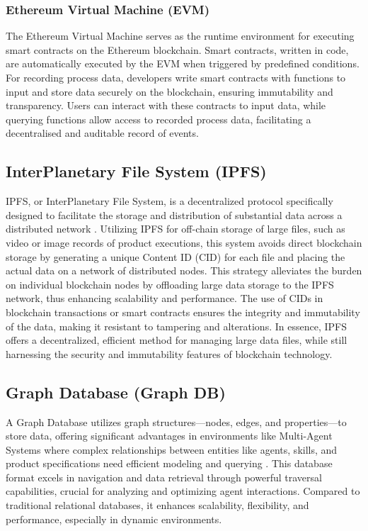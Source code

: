 \documentclass[conference]{IEEEtran}
\begin{document}
\subsubsection{Ethereum Virtual Machine (EVM)}
\label{EVM}
The Ethereum Virtual Machine \cite{hildenbrandt2018kevm} serves as the runtime environment for executing smart contracts on the Ethereum blockchain. Smart contracts, written in code, are automatically executed by the EVM when triggered by predefined conditions. For recording process data, developers write smart contracts with functions to input and store data securely on the blockchain, ensuring immutability and transparency. Users can interact with these contracts to input data, while querying functions allow access to recorded process data, facilitating a decentralised and auditable record of events.

\subsection{InterPlanetary File System (IPFS)}
\label{IPFS}

IPFS, or InterPlanetary File System, is a decentralized protocol specifically designed to facilitate the storage and distribution of substantial data across a distributed network \cite{benet2014ipfs}. Utilizing IPFS for off-chain storage of large files, such as video or image records of product executions, this system avoids direct blockchain storage by generating a unique Content ID (CID) for each file and placing the actual data on a network of distributed nodes. This strategy alleviates the burden on individual blockchain nodes by offloading large data storage to the IPFS network, thus enhancing scalability and performance. The use of CIDs in blockchain transactions or smart contracts ensures the integrity and immutability of the data, making it resistant to tampering and alterations. In essence, IPFS offers a decentralized, efficient method for managing large data files, while still harnessing the security and immutability features of blockchain technology.

\subsection{Graph Database (Graph DB)}
\label{graphdb}

A Graph Database utilizes graph structures—nodes, edges, and properties—to store data, offering significant advantages in environments like Multi-Agent Systems where complex relationships between entities like agents, skills, and product specifications need efficient modeling and querying \cite{GraphDBDocumentation}. This database format excels in navigation and data retrieval through powerful traversal capabilities, crucial for analyzing and optimizing agent interactions. Compared to traditional relational databases, it enhances scalability, flexibility, and performance, especially in dynamic environments.
\end{document}
